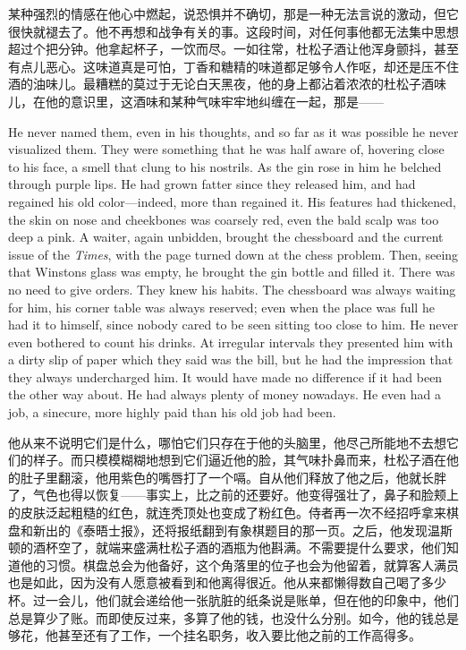 \begin{paracol}{2}
\switchcolumn

某种强烈的情感在他心中燃起，说恐惧并不确切，那是一种无法言说的激动，但它很快就褪去了。他不再想和战争有关的事。这段时间，对任何事他都无法集中思想超过个把分钟。他拿起杯子，一饮而尽。一如往常，杜松子酒让他浑身颤抖，甚至有点儿恶心。这味道真是可怕，丁香和糖精的味道都足够令人作呕，却还是压不住酒的油味儿。最糟糕的莫过于无论白天黑夜，他的身上都沾着浓浓的杜松子酒味儿，在他的意识里，这酒味和某种气味牢牢地纠缠在一起，那是——

\switchcolumn*

He never named them, even in his thoughts, and so far as it was possible
he never visualized them. They were something that he was half aware of,
hovering close to his face, a smell that clung to his nostrils. As the
gin rose in him he belched through purple lips. He had grown fatter
since they released him, and had regained his old color---indeed, more
than regained it. His features had thickened, the skin on nose and
cheekbones was coarsely red, even the bald scalp was too deep a pink. A
waiter, again unbidden, brought the chessboard and the current issue of
the \emph{Times}, with the page turned down at the chess problem. Then,
seeing that Winston\textquotesingle s glass was empty, he brought the
gin bottle and filled it. There was no need to give orders. They knew
his habits. The chessboard was always waiting for him, his corner table
was always reserved; even when the place was full he had it to himself,
since nobody cared to be seen sitting too close to him. He never even
bothered to count his drinks. At irregular intervals they presented him
with a dirty slip of paper which they said was the bill, but he had the
impression that they always undercharged him. It would have made no
difference if it had been the other way about. He had always plenty of
money nowadays. He even had a job, a sinecure, more highly paid than his
old job had been.

\switchcolumn

他从来不说明它们是什么，哪怕它们只存在于他的头脑里，他尽己所能地不去想它们的样子。而只模模糊糊地想到它们逼近他的脸，其气味扑鼻而来，杜松子酒在他的肚子里翻滚，他用紫色的嘴唇打了一个嗝。自从他们释放了他之后，他就长胖了，气色也得以恢复——事实上，比之前的还要好。他变得强壮了，鼻子和脸颊上的皮肤泛起粗糙的红色，就连秃顶处也变成了粉红色。侍者再一次不经招呼拿来棋盘和新出的《泰晤士报》，还将报纸翻到有象棋题目的那一页。之后，他发现温斯顿的酒杯空了，就端来盛满杜松子酒的酒瓶为他斟满。不需要提什么要求，他们知道他的习惯。棋盘总会为他备好，这个角落里的位子也会为他留着，就算客人满员也是如此，因为没有人愿意被看到和他离得很近。他从来都懒得数自己喝了多少杯。过一会儿，他们就会递给他一张肮脏的纸条说是账单，但在他的印象中，他们总是算少了账。而即使反过来，多算了他的钱，也没什么分别。如今，他的钱总是够花，他甚至还有了工作，一个挂名职务，收入要比他之前的工作高得多。


\end{paracol}
